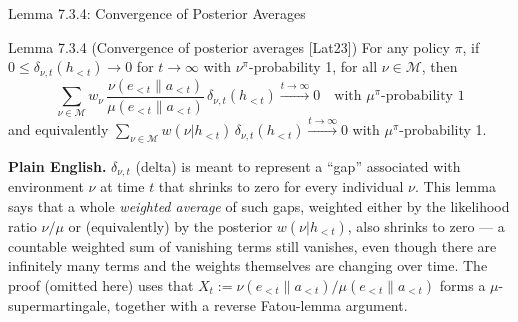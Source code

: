 \documentclass[aspectratio=169,10pt]{beamer}
\newcommand{\Mcal}{\mathcal{M}}
\begin{document}
\begin{frame}{Lemma 7.3.4: Convergence of Posterior Averages}
  \begin{block}{Lemma 7.3.4 (Convergence of posterior averages [Lat23])}
    For any policy $\pi$, if $0\le\delta_{\nu,t}(h_{<t})\to0$ for
    $t\to\infty$ with $\nu^\pi$-probability 1, for all $\nu\in\Mcal$, then
    \[
      \sum_{\nu\in\Mcal} w_\nu\,\frac{\nu(e_{<t}\|a_{<t})}{\mu(e_{<t}\|a_{<t})}\,
      \delta_{\nu,t}(h_{<t}) \xrightarrow{t\to\infty} 0
      \quad\text{with } \mu^\pi\text{-probability 1}
    \]
    and equivalently
    $\displaystyle\sum_{\nu\in\Mcal} w(\nu|h_{<t})\,\delta_{\nu,t}(h_{<t})
    \xrightarrow{t\to\infty} 0$ with $\mu^\pi$-probability 1.
  \end{block}
  \textbf{Plain English.} $\delta_{\nu,t}$ (delta) is meant to represent a
  ``gap'' associated with environment $\nu$ at time $t$ that shrinks to zero
  for every individual $\nu$. This lemma says that a whole \emph{weighted
  average} of such gaps, weighted either by the likelihood ratio
  $\nu/\mu$ or (equivalently) by the posterior $w(\nu|h_{<t})$, also shrinks
  to zero --- a countable weighted sum of vanishing terms still vanishes,
  even though there are infinitely many terms and the weights themselves are
  changing over time. The proof (omitted here) uses that
  $X_t:=\nu(e_{<t}\|a_{<t})/\mu(e_{<t}\|a_{<t})$ forms a
  $\mu$-supermartingale, together with a reverse Fatou-lemma argument.
\end{frame}
\end{document}
